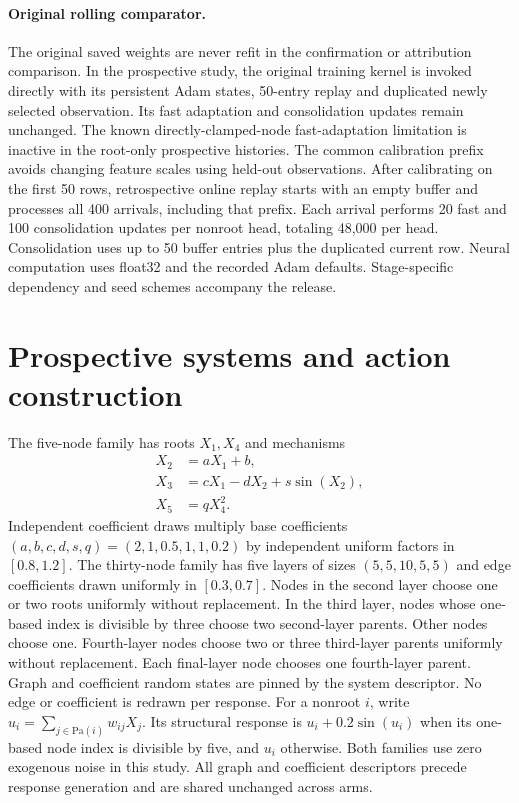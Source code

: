 \paragraph{Original rolling comparator.}
The original saved weights are never refit in the confirmation or attribution
comparison. In the prospective study, the original training kernel is invoked
directly with its persistent Adam states, 50-entry replay and duplicated newly
selected observation. Its fast adaptation and consolidation updates remain
unchanged. The known directly-clamped-node fast-adaptation limitation is inactive
in the root-only prospective histories. The common calibration prefix avoids
changing feature scales using held-out observations.
After calibrating on the first 50 rows, retrospective online replay starts with
an empty buffer and processes all 400 arrivals, including that prefix. Each
arrival performs 20 fast and 100 consolidation updates per nonroot head, totaling
48,000 per head. Consolidation uses up to 50 buffer entries plus the duplicated
current row. Neural computation uses float32 and the recorded Adam defaults.
Stage-specific dependency and seed schemes accompany the release.

\section{Prospective systems and action construction}
\label{app:systems}
The five-node family has roots $X_1,X_4$ and mechanisms
\[
\begin{aligned}
 X_2&=aX_1+b,\\
 X_3&=cX_1-dX_2+s\sin(X_2),\\
 X_5&=qX_4^2.
\end{aligned}
\]
Independent coefficient draws multiply base coefficients
$(a,b,c,d,s,q)=(2,1,0.5,1,1,0.2)$ by independent uniform factors in
$[0.8,1.2]$. The thirty-node family has five layers of sizes $(5,5,10,5,5)$ and edge
coefficients drawn uniformly in $[0.3,0.7]$. Nodes in the second layer choose
one or two roots uniformly without replacement. In the third layer, nodes
whose one-based index is divisible by three choose two second-layer parents.
Other nodes choose one. Fourth-layer nodes choose two or three third-layer
parents uniformly without replacement. Each final-layer node chooses one
fourth-layer parent. Graph and coefficient random states are pinned by the
system descriptor. No edge or coefficient is redrawn per response. For a nonroot
$i$, write $u_i=\sum_{j\in\mathrm{Pa}(i)}w_{ij}X_j$. Its structural response
is $u_i+0.2\sin(u_i)$ when its one-based node index is divisible by five,
and $u_i$ otherwise. Both families use zero exogenous noise in this study.
All graph and coefficient descriptors precede response generation and are
shared unchanged across arms.

